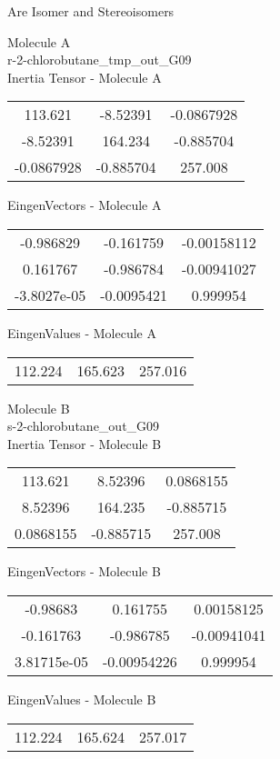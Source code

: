 \begin{center}
\vtab
\vtab
\textcolor{NavyBlue}{\Large Are Isomer and Stereoisomers}
\end{center}
\newpage
\begin{multicols}{2}
\begin{center}
Molecule A \\ 
r-2-chlorobutane\_tmp\_out\_G09
\\
Inertia Tensor - Molecule A \\
\vtab
\begin{tabular}{|c c c|}
113.621	 & 	-8.52391	 & 	-0.0867928	 \\
-8.52391	 & 	164.234	 & 	-0.885704	 \\
-0.0867928	 & 	-0.885704	 & 	257.008
\end{tabular}

\vtab
 EingenVectors - Molecule A     \\
\vtab
\begin{tabular}{|c c c|}
-0.986829	 & 	-0.161759	 & 	-0.00158112	 \\
0.161767	 & 	-0.986784	 & 	-0.00941027	 \\
-3.8027e-05	 & 	-0.0095421	 & 	0.999954
\end{tabular}

\vtab
 EingenValues - Molecule A     \\
\vtab
\begin{tabular}{|c c c|}
112.224	 & 	165.623	 & 	257.016
\end{tabular}
\columnbreak

Molecule B \\ 
s-2-chlorobutane\_out\_G09
\\
Inertia Tensor - Molecule B \\
\vtab
\begin{tabular}{|c c c|}
113.621	 & 	8.52396	 & 	0.0868155	 \\
8.52396	 & 	164.235	 & 	-0.885715	 \\
0.0868155	 & 	-0.885715	 & 	257.008
\end{tabular}

\vtab
 EingenVectors - Molecule B     \\
\vtab
\begin{tabular}{|c c c|}
-0.98683	 & 	0.161755	 & 	0.00158125	 \\
-0.161763	 & 	-0.986785	 & 	-0.00941041	 \\
3.81715e-05	 & 	-0.00954226	 & 	0.999954
\end{tabular}

\vtab
 EingenValues - Molecule B     \\
\vtab
\begin{tabular}{|c c c|}
112.224	 & 	165.624	 & 	257.017
\end{tabular}

\end{center}
\end{multicols}

